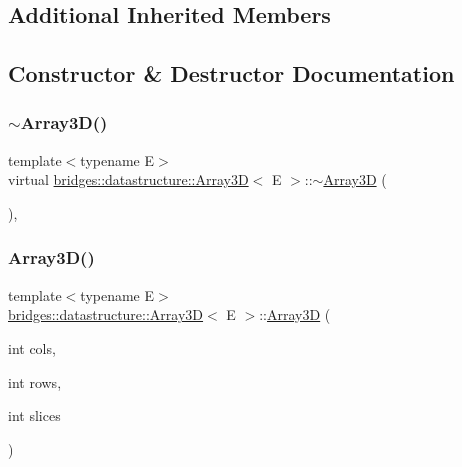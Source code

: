 \subsection*{Additional Inherited Members}


\subsection{Constructor \& Destructor Documentation}
\mbox{\label{classbridges_1_1datastructure_1_1_array3_d_afad3212fe6c2954859a7ea6dce7a739c}} 
\subsubsection{\texorpdfstring{$\sim$\+Array3\+D()}{~Array3D()}}
{\footnotesize\ttfamily template$<$typename E$>$ \\
virtual \hyperlink{classbridges_1_1datastructure_1_1_array3_d}{bridges\+::datastructure\+::\+Array3D}$<$ E $>$\+::$\sim$\hyperlink{classbridges_1_1datastructure_1_1_array3_d}{Array3D} (\begin{DoxyParamCaption}{ }\end{DoxyParamCaption})\hspace{0.3cm}{\ttfamily [inline]}, {\ttfamily [virtual]}}

\mbox{\label{classbridges_1_1datastructure_1_1_array3_d_afcda227020737d25a23774fc9f1a5259}} 
\subsubsection{\texorpdfstring{Array3\+D()}{Array3D()}}
{\footnotesize\ttfamily template$<$typename E$>$ \\
\hyperlink{classbridges_1_1datastructure_1_1_array3_d}{bridges\+::datastructure\+::\+Array3D}$<$ E $>$\+::\hyperlink{classbridges_1_1datastructure_1_1_array3_d}{Array3D} (\begin{DoxyParamCaption}\item[{int}]{cols,  }\item[{int}]{rows,  }\item[{int}]{slices }\end{DoxyParamCaption})\hspace{0.3cm}{\ttfamily [inline]}}


